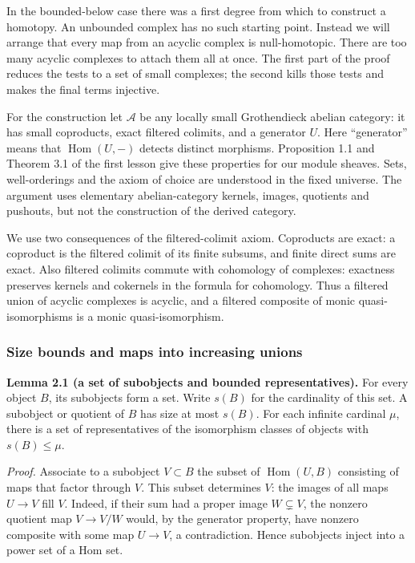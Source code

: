 \documentclass[
  english,
  11pt,
  a4paper,
]{article}
\begin{document}
In the bounded-below case there was a first degree from which to
construct a homotopy. An unbounded complex has no such starting point.
Instead we will arrange that every map from an acyclic complex is
null-homotopic. There are too many acyclic complexes to attach them all
at once. The first part of the proof reduces the tests to a set of small
complexes; the second kills those tests and makes the final terms
injective.

For the construction let \(\mathcal A\) be any locally small
Grothendieck abelian category: it has small coproducts, exact filtered
colimits, and a generator \(U\). Here ``generator'' means that
\(\operatorname{Hom}(U,-)\) detects distinct morphisms. Proposition 1.1
and Theorem 3.1 of the first lesson give these properties for our module
sheaves. Sets, well-orderings and the axiom of choice are understood in
the fixed universe. The argument uses elementary abelian-category
kernels, images, quotients and pushouts, but not the construction of the
derived category.

We use two consequences of the filtered-colimit axiom. Coproducts are
exact: a coproduct is the filtered colimit of its finite subsums, and
finite direct sums are exact. Also filtered colimits commute with
cohomology of complexes: exactness preserves kernels and cokernels in
the formula for cohomology. Thus a filtered union of acyclic complexes
is acyclic, and a filtered composite of monic quasi-isomorphisms is a
monic quasi-isomorphism.

\subsubsection{Size bounds and maps into increasing
unions}\label{k-injective-resolutions-in-grothendieck-categories--size-bounds-and-maps-into-increasing-unions}

\textbf{Lemma 2.1 (a set of subobjects and bounded representatives).}
For every object \(B\), its subobjects form a set. Write \(s(B)\) for
the cardinality of this set. A subobject or quotient of \(B\) has size
at most \(s(B)\). For each infinite cardinal \(\mu\), there is a set of
representatives of the isomorphism classes of objects with
\(s(B)\leq\mu\).

\emph{Proof.} Associate to a subobject \(V\subset B\) the subset of
\(\operatorname{Hom}(U,B)\) consisting of maps that factor through
\(V\). This subset determines \(V\): the images of all maps \(U\to V\)
fill \(V\). Indeed, if their sum had a proper image \(W\subsetneq V\),
the nonzero quotient map \(V\to V/W\) would, by the generator property,
have nonzero composite with some map \(U\to V\), a contradiction. Hence
subobjects inject into a power set of a Hom set.
\end{document}
